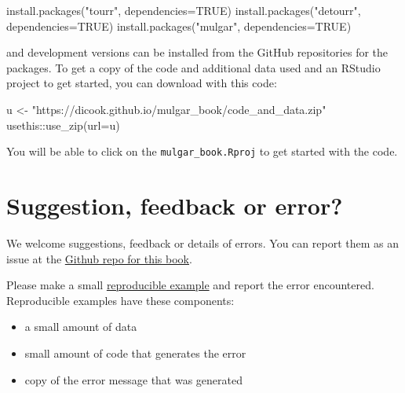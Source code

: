 \documentclass[
  letterpaper,
]{krantz}
\newenvironment{Shaded}{\begin{snugshade}}{\end{snugshade}}
\newcommand{\AttributeTok}[1]{\textcolor[rgb]{0.40,0.45,0.13}{#1}}
\newcommand{\ConstantTok}[1]{\textcolor[rgb]{0.56,0.35,0.01}{#1}}
\newcommand{\FunctionTok}[1]{\textcolor[rgb]{0.28,0.35,0.67}{#1}}
\newcommand{\NormalTok}[1]{\textcolor[rgb]{0.00,0.23,0.31}{#1}}
\newcommand{\OtherTok}[1]{\textcolor[rgb]{0.00,0.23,0.31}{#1}}
\newcommand{\SpecialCharTok}[1]{\textcolor[rgb]{0.37,0.37,0.37}{#1}}
\newcommand{\StringTok}[1]{\textcolor[rgb]{0.13,0.47,0.30}{#1}}
\providecommand{\tightlist}{%
  \setlength{\itemsep}{0pt}\setlength{\parskip}{0pt}}\usepackage{longtable,booktabs,array}
\begin{document}
\begin{Shaded}
\begin{Highlighting}[]
\FunctionTok{install.packages}\NormalTok{(}\StringTok{"tourr"}\NormalTok{, }\AttributeTok{dependencies=}\ConstantTok{TRUE}\NormalTok{)}
\FunctionTok{install.packages}\NormalTok{(}\StringTok{"detourr"}\NormalTok{, }\AttributeTok{dependencies=}\ConstantTok{TRUE}\NormalTok{)}
\FunctionTok{install.packages}\NormalTok{(}\StringTok{"mulgar"}\NormalTok{, }\AttributeTok{dependencies=}\ConstantTok{TRUE}\NormalTok{)}
\end{Highlighting}
\end{Shaded}

and development versions can be installed from the GitHub repositories
for the packages. To get a copy of the code and additional data used and
an RStudio project to get started, you can download with this code:

\begin{Shaded}
\begin{Highlighting}[]
\NormalTok{u }\OtherTok{\textless{}{-}} \StringTok{"https://dicook.github.io/mulgar\_book/code\_and\_data.zip"}
\NormalTok{usethis}\SpecialCharTok{::}\FunctionTok{use\_zip}\NormalTok{(}\AttributeTok{url=}\NormalTok{u)}
\end{Highlighting}
\end{Shaded}

You will be able to click on the \texttt{mulgar\_book.Rproj} to get
started with the code.

\section*{Suggestion, feedback or
error?}\label{suggestion-feedback-or-error}


We welcome suggestions, feedback or details of errors. You can report
them as an issue at the
\href{https://github.com/dicook/mulgar_book}{Github repo for this book}.

Please make a small \href{https://reprex.tidyverse.org}{reproducible
example} and report the error encountered. Reproducible examples have
these components:

\begin{itemize}
\tightlist
\item
  a small amount of data
\item
  small amount of code that generates the error
\item
  copy of the error message that was generated
\end{itemize}
\end{document}
